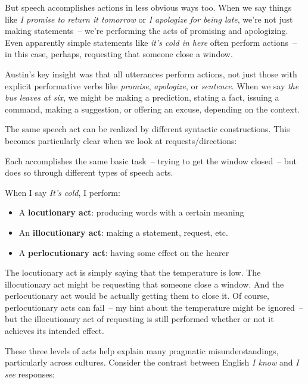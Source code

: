 But speech accomplishes actions in less obvious ways too. When we say things like \textit{I promise to return it tomorrow} or \textit{I apologize for being late}, we're not just making statements~-- we're performing the acts of promising and apologizing. Even apparently simple statements like \textit{it's cold in here} often perform actions~-- in this case, perhaps, requesting that someone close a window.

Austin's key insight was that all utterances perform actions, not just those with explicit performative verbs like \textit{promise}, \textit{apologize}, or \textit{sentence}. When we say \textit{the bus leaves at six}, we might be making a prediction, stating a fact, issuing a command, making a suggestion, or offering an excuse, depending on the context.

The same speech act can be realized by different syntactic constructions. This becomes particularly clear when we look at requests/directions:

\ea
   \z
\z

Each accomplishes the same basic task~-- trying to get the window closed~-- but does so through different types of speech acts.

When I say \textit{It's cold}, I perform:
\begin{itemize}[noitemsep]
   \item A \textbf{locutionary act}: producing words with a certain meaning 
   \item An \textbf{illocutionary act}: making a statement, request, etc. 
   \item A \textbf{perlocutionary act}: having some effect on the hearer 
\end{itemize}

The locutionary act is simply saying that the temperature is low. The illocutionary act might be requesting that someone close a window. And the perlocutionary act would be actually getting them to close it. Of course, perlocutionary acts can fail~-- my hint about the temperature might be ignored~-- but the illocutionary act of requesting is still performed whether or not it achieves its intended effect.

These three levels of acts help explain many pragmatic misunderstandings, particularly across cultures. Consider the contrast between English \textit{I know} and \textit{I see} responses:

